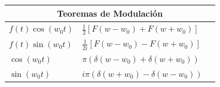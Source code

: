 \documentclass[12pt, fleqn]{report}                             %
\theoremstyle{break}                                            %
\newcommand{\Wrap}[1]           {\left( #1 \right)}             %
\newcommand{\Cos}[1] {\cos\Wrap{#1}}                            %
\newcommand{\Sin}[1] {\sin\Wrap{#1}}                            %
\begin{document}
\begin{table}[ht]
\begin{tabular}{|m{16em}|m{16em}|@{}m{0pt}@{}}
                    \multicolumn{3}{|c|}{Teoremas de Modulación}                        \\            \hline
                    $f(t) \Cos{w_0t}  $     & $\frac{1}{2}[F(w-w_0)+F(w+w_0)]           $ &\\[1em]    \hline
                    $f(t) \Sin{w_0t}  $     & $\frac{1}{2i}[F(w-w_0)-F(w+w_0)]          $ &\\[1em]    \hline
                    $\Cos{w_0t}       $     & $\pi(\delta(w-w_0)+\delta(w+w_0))         $ &\\[1em]    \hline
                    $\Sin{w_0t}       $     & $i\pi(\delta(w+w_0)-\delta(w-w_0))        $ &\\[1em]    \hline
                    
                
                \end{tabular}
            \end{table}

            \clearpage
\end{document}
